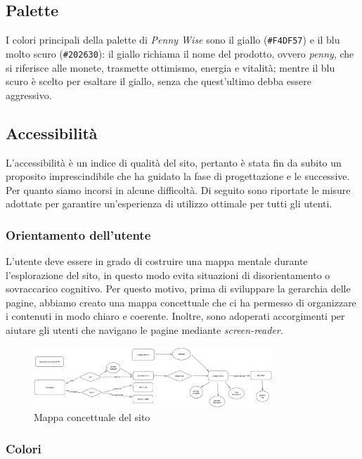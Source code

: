 \subsection{Palette}

I colori principali della palette di \textit{Penny Wise} sono il giallo 
(\texttt{\#F4DF57}) e il blu molto scuro (\texttt{\#202630}): il giallo richiama 
il nome del prodotto, ovvero \textit{penny}, che si riferisce alle monete, 
trasmette ottimismo, energia e vitalità; mentre il blu scuro è scelto per 
esaltare il giallo, senza che quest'ultimo debba essere aggressivo.

\subsection{Accessibilità}

L'accessibilità è un indice di qualità del sito, pertanto è stata fin da subito
un proposito imprescindibile che ha guidato la fase di progettazione e le
successive. Per quanto siamo incorsi in alcune difficoltà. Di seguito sono
riportate le misure adottate per garantire un'esperienza di utilizzo ottimale
per tutti gli utenti.

\subsubsection{Orientamento dell'utente}

L'utente deve essere in grado di costruire una mappa mentale durante
l'esplorazione del sito, in questo modo evita situazioni di disorientamento o
sovraccarico cognitivo. Per questo motivo, prima di sviluppare la gerarchia
delle pagine, abbiamo creato una mappa concettuale che ci ha permesso di 
organizzare i contenuti in modo chiaro e coerente. Inoltre, sono adoperati
accorgimenti per aiutare gli utenti che navigano le pagine mediante
\textit{screen-reader}.

\begin{figure}[H]
	\centering
	\includegraphics[width=0.8\textwidth]{figures/sitemap.png}
	\caption{Mappa concettuale del sito}
\end{figure}

\subsubsection{Colori}

